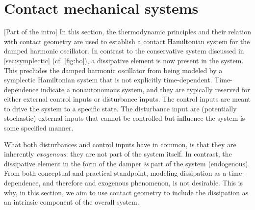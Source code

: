 \section{Contact mechanical systems}
\label{sec:contact}

[Part of the intro]
In this section, the thermodynamic principles and their relation with contact geometry are used to establish a contact Hamiltonian system for the damped harmonic oscillator. In contrast to the conservative system discussed in \cref{sec:symplectic} (cf. \cref{fig:ho}), a dissipative element is now present in the system. This precludes the damped harmonic oscillator from being modeled by a symplectic Hamiltonian system that is not explicitly time-dependent. Time-dependence indicate a nonautonomous system, and they are typically reserved for either external control inputs or disturbance inputs. The control inputs are meant to drive the system to a specific state. The disturbance input are (potentially stochastic) external inputs that cannot be controlled but influence the system is some specified manner. 

What both disturbances and control inputs have in common, is that they are inherently \emph{exogenous}: they are not part of the system itself. In contrast, the dissipative element in the form of the damper \emph{is} part of the system (endogenous). From both conceptual and practical standpoint, modeling dissipation as a time-dependence, and therefore and exogenous phenomenon, is not desirable. This is why, in this section, we aim to use contact geometry to include the dissipation as an intrinsic component of the overall system.

